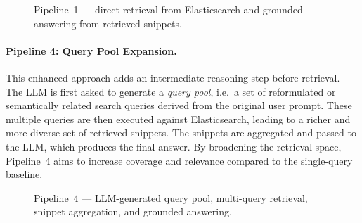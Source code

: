 \documentclass[manuscript,screen]{acmart}
\begin{document}
\begin{CCSXML}
\begin{figure}[H]
{%
		}
		\caption{Pipeline~1 — direct retrieval from Elasticsearch and grounded answering from retrieved snippets.}
		\label{fig:pipeline1}
	\end{figure}
	
	\paragraph{Pipeline 4: Query Pool Expansion.}
	This enhanced approach adds an intermediate reasoning step before retrieval.
	The LLM is first asked to generate a \emph{query pool}, i.e.\ a set of
	reformulated or semantically related search queries derived from the original
	user prompt. These multiple queries are then executed against Elasticsearch,
	leading to a richer and more diverse set of retrieved snippets. The snippets
	are aggregated and passed to the LLM, which produces the final answer. By
	broadening the retrieval space, Pipeline~4 aims to increase coverage and
	relevance compared to the single-query baseline.
	
	\begin{figure}[H]
		\centering
		\caption{Pipeline~4 — LLM-generated query pool, multi-query retrieval, snippet aggregation, and grounded answering.}
		\label{fig:pipeline4}
	\end{figure}




\end{CCSXML}
\end{document}
